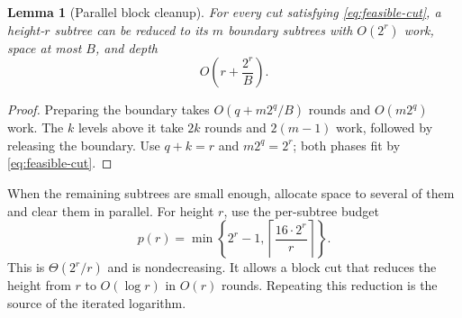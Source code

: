 \documentclass[11pt]{article}
\newtheorem{lemma}[lemma]{Lemma}
\theoremstyle{definition}
\theoremstyle{remark}
\begin{document}
\begin{lemma}[Parallel block cleanup]
\label{cor:parallel-contraction}
For every cut satisfying \cref{eq:feasible-cut}, a height-$r$ subtree can be reduced to its $m$ boundary subtrees with $O(2^r)$ work, space at most $B$, and depth
\begin{equation}
O\!\left(r+\frac{2^r}{B}\right).
\label{eq:parallel-contraction}
\end{equation}
\end{lemma}
\begin{proof}
Preparing the boundary takes $O(q+m2^q/B)$ rounds and $O(m2^q)$ work. The $k$ levels above it take $2k$ rounds and $2(m-1)$ work, followed by releasing the boundary. Use $q+k=r$ and $m2^q=2^r$; both phases fit by \cref{eq:feasible-cut}.
\end{proof}

When the remaining subtrees are small enough, allocate space to several of them and clear them in parallel. For height $r$, use the per-subtree budget
\begin{equation}
p(r)=\min\left\{2^r-1,\left\lceil\frac{16\cdot2^r}{r}\right\rceil\right\}.
\label{eq:resolver-space}
\end{equation}
This is $\Theta(2^r/r)$ and is nondecreasing. It allows a block cut that reduces the height from $r$ to $O(\log r)$ in $O(r)$ rounds. Repeating this reduction is the source of the iterated logarithm.
\end{document}
